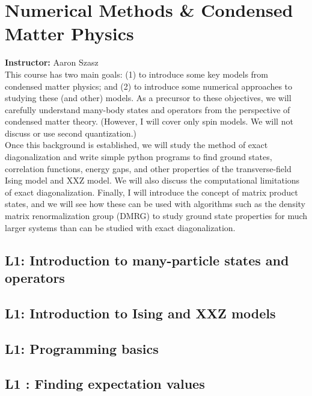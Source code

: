 \documentclass{book}
\theoremstyle{definition}
\begin{document}
\newpage
\chapter{Numerical Methods \& Condensed Matter Physics}

\textbf{Instructor:} Aaron Szasz\\

This course has two main goals: (1) to introduce some key models from condensed matter physics; and (2) to introduce some numerical approaches to studying these (and other) models.  As a precursor to these objectives, we will carefully understand many-body states and operators from the perspective of condensed matter theory.  (However, I will cover only spin models.  We will not discuss or use second quantization.)\\



Once this background is established, we will study the method of exact diagonalization and write simple python programs to find ground states, correlation functions, energy gaps, and other properties of the transverse-field Ising model and XXZ model.  We will also discuss the computational limitations of exact diagonalization.  Finally, I will introduce the concept of matrix product states, and we will see how these can be used with algorithms such as the density matrix renormalization group (DMRG) to study ground state properties for much larger systems than can be studied with exact diagonalization.




\newpage


\section{L1: Introduction to many-particle states and operators}

\section{L1: Introduction to Ising and XXZ models}

\section{L1: Programming basics}

\section{L1 : Finding expectation values}
\end{document}
